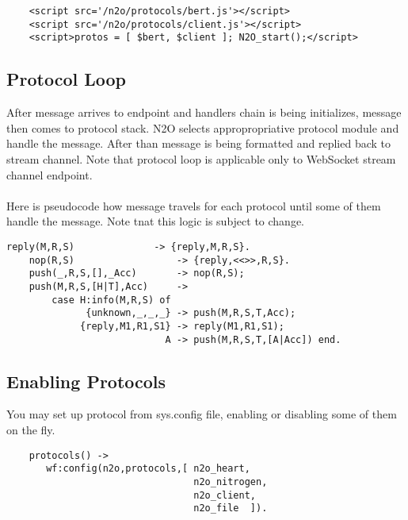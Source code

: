 \vspace{1\baselineskip}
\begin{lstlisting}
    <script src='/n2o/protocols/bert.js'></script>
    <script src='/n2o/protocols/client.js'></script>
    <script>protos = [ $bert, $client ]; N2O_start();</script>
\end{lstlisting}


\newpage
\subsection*{Protocol Loop}
After message arrives to endpoint and handlers chain is being initializes,
message then comes to protocol stack. N2O selects appropropriative protocol
module and handle the message. After than message is being formatted and
replied back to stream channel. Note that protocol loop is applicable
only to WebSocket stream channel endpoint.


\paragraph{}
Here is pseudocode how message travels for each protocol until some
of them handle the message. Note tnat this logic is subject to change.

\vspace{1\baselineskip}
\begin{lstlisting}[caption=Top-level protocol loop in {n2o}\_{proto}]
    reply(M,R,S)              -> {reply,M,R,S}.
    nop(R,S)                  -> {reply,<<>>,R,S}.
    push(_,R,S,[],_Acc)       -> nop(R,S);
    push(M,R,S,[H|T],Acc)     ->
        case H:info(M,R,S) of
              {unknown,_,_,_} -> push(M,R,S,T,Acc);
             {reply,M1,R1,S1} -> reply(M1,R1,S1);
                            A -> push(M,R,S,T,[A|Acc]) end.
\end{lstlisting}
\vspace{1\baselineskip}

\newpage
\subsection*{Enabling Protocols}
You may set up protocol from sys.config file,
enabling or disabling some of them on the fly.

\vspace{1\baselineskip}
\begin{lstlisting}
    protocols() ->
       wf:config(n2o,protocols,[ n2o_heart,
                                 n2o_nitrogen,
                                 n2o_client,
                                 n2o_file  ]).

\end{lstlisting}
\vspace{1\baselineskip}

